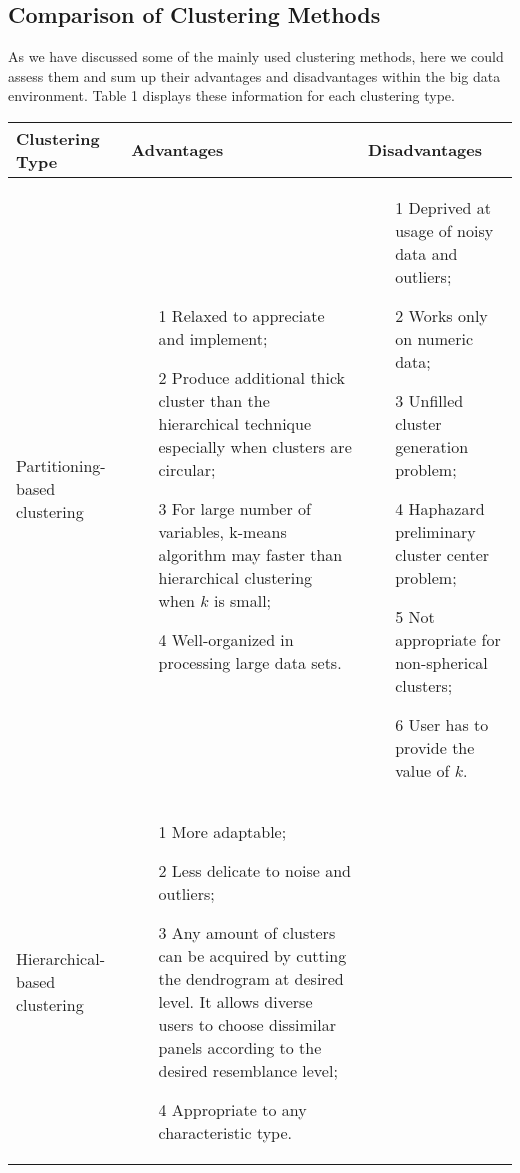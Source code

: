 \documentclass[sigconf]{acmart}
\begin{document}
\subsection{Comparison of Clustering Methods}

As we have discussed some of the mainly used clustering methods, here we could assess them and sum up their advantages and disadvantages within the big data environment. Table 1 displays these information for each clustering type.
\begin{table*}[htb]
\centering
\begin{tabular}{|p{}|p{}|p{}|} \hline
\textsf{Clustering Type } & \textsf{Advantages} & \textsf{Disadvantages} \\ \hline
Partitioning-based clustering & \begin{itemize}
\item[1] Relaxed to appreciate and implement;
\item[2] Produce additional thick cluster than the hierarchical technique especially when clusters are circular;
\item[3] For large number of variables, k-means algorithm may faster than hierarchical clustering when $k$ is small;
\item[4] Well-organized in processing large data sets.
\end{itemize} & \begin{itemize}
\item[1] Deprived at usage of noisy data and outliers;
\item[2] Works only on numeric data;
\item[3] Unfilled cluster generation problem;
\item[4] Haphazard preliminary cluster center problem;
\item[5] Not appropriate for non-spherical clusters;
\item[6] User has to provide the value of $k$.
\end{itemize} \\ \hline
Hierarchical-based clustering & \begin{itemize}
\item[1] More adaptable;
\item[2] Less delicate to noise and outliers;
\item[3] Any amount of clusters can be acquired by cutting the dendrogram at desired level. It allows diverse users to choose dissimilar panels according to the desired resemblance level;
\item[4] Appropriate to any characteristic type.

\end{itemize}
\end{tabular}
\end{table*}
\end{document}
